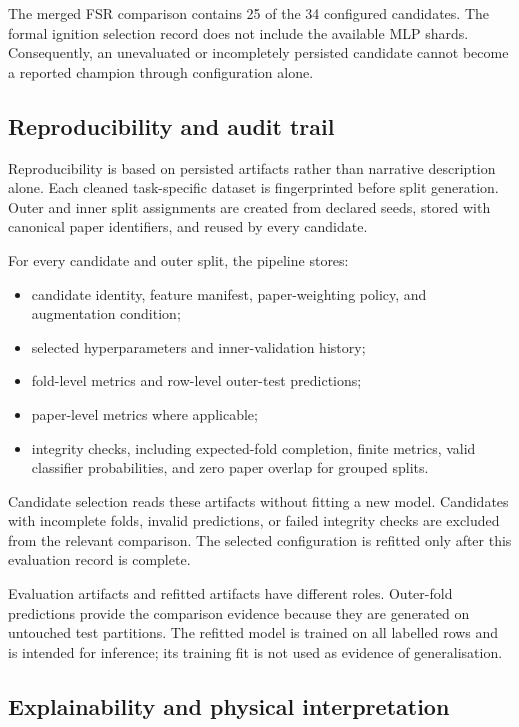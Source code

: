 The merged FSR comparison contains 25 of the 34 configured candidates. The
formal ignition selection record does not include the available MLP shards.
Consequently, an unevaluated or incompletely persisted candidate cannot become
a reported champion through configuration alone.

\subsection{Reproducibility and audit trail}
\label{sec:method-reproducibility}

Reproducibility is based on persisted artifacts rather than narrative
description alone. Each cleaned task-specific dataset is fingerprinted before
split generation. Outer and inner split assignments are created from declared
seeds, stored with canonical paper identifiers, and reused by every candidate.

For every candidate and outer split, the pipeline stores:

\begin{itemize}
  \item candidate identity, feature manifest, paper-weighting policy, and
  augmentation condition;
  \item selected hyperparameters and inner-validation history;
  \item fold-level metrics and row-level outer-test predictions;
  \item paper-level metrics where applicable;
  \item integrity checks, including expected-fold completion, finite metrics,
  valid classifier probabilities, and zero paper overlap for grouped splits.
\end{itemize}

Candidate selection reads these artifacts without fitting a new model.
Candidates with incomplete folds, invalid predictions, or failed integrity
checks are excluded from the relevant comparison. The selected configuration is
refitted only after this evaluation record is complete.

Evaluation artifacts and refitted artifacts have different roles. Outer-fold
predictions provide the comparison evidence because they are generated on
untouched test partitions. The refitted model is trained on all labelled rows
and is intended for inference; its training fit is not used as evidence of
generalisation.

\subsection{Explainability and physical interpretation}
\label{sec:method-explainability}

